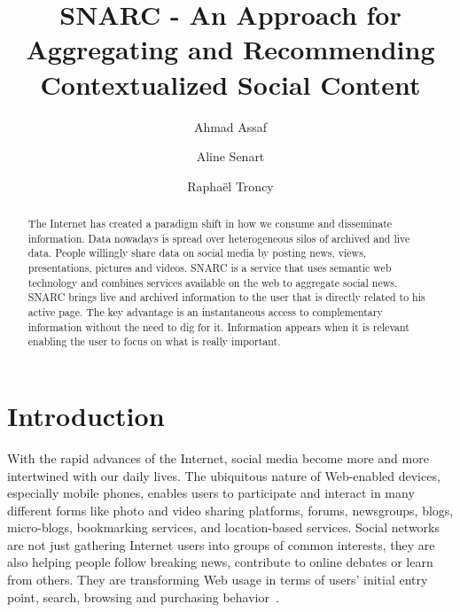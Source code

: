 \documentclass[oribibl]{../../Tools/LaTEX/llncs}
\begin{document}
\title{SNARC - An Approach for Aggregating and Recommending Contextualized Social Content}
\author{Ahmad Assaf \and Aline Senart \and Rapha\"{e}l Troncy}
\maketitle


\begin{abstract}
The Internet has created a paradigm shift in how we consume and disseminate information. Data nowadays is spread over heterogeneous silos of archived and live data. People willingly share data on social media by posting news, views, presentations, pictures and videos. SNARC is a service that uses semantic web technology and combines services available on the web to aggregate social news. SNARC brings live and archived information to the user that is directly related to his active page. The key advantage is an instantaneous access to complementary information without the need to dig for it. Information appears when it is relevant enabling the user to focus on what is really important.
\end{abstract}


\section{Introduction}
With the rapid advances of the Internet, social media become more and more intertwined with our daily lives. The ubiquitous nature of Web-enabled devices, especially mobile phones, enables users to participate and interact in many different forms like photo and video sharing platforms, forums, newsgroups, blogs, micro-blogs, bookmarking services, and location-based services. Social networks are not just gathering Internet users into groups of common interests, they are also helping people follow breaking news, contribute to online debates or learn from others. They are transforming Web usage in terms of users' initial entry point, search, browsing and purchasing behavior~\cite{Bakshy:WWW:12}.
\end{document}
